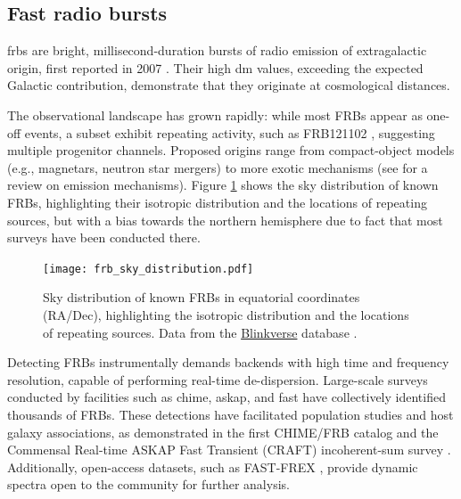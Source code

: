 \subsection{Fast radio bursts}
\label{sec:frbs}

\glspl{frb} are bright, millisecond-duration bursts of radio emission of extragalactic origin, first reported in 2007 \citep{Lorimer_2007}. Their high \gls{dm} values, exceeding the expected Galactic contribution, demonstrate that they originate at cosmological distances. 


The observational landscape has grown rapidly: while most FRBs appear as one-off events, a subset exhibit repeating activity, such as FRB121102 \citep{Spitler_2016}, suggesting multiple progenitor channels. Proposed origins range from compact-object models (e.g., magnetars, neutron star mergers) to more exotic mechanisms (see \citealt{Zhang2023physics} for a review on emission mechanisms). Figure \ref{fig:frb_sky_distribution} shows the sky distribution of known FRBs, highlighting their isotropic distribution \citep{Josephy2021} and the locations of repeating sources, but with a bias towards the northern hemisphere due to fact that most surveys have been conducted there.

\begin{figure}[h!]
	\centering
	\texttt{[image: frb\_sky\_distribution.pdf]}
	\caption[Sky distribution of known FRBs]{Sky distribution of known FRBs in equatorial coordinates (RA/Dec), highlighting the isotropic distribution and the locations of repeating sources. Data from the \href{https://blinkverse.zero2x.org/overview}{Blinkverse} database \citep{Blinkverse2023}.}
	\label{fig:frb_sky_distribution}
\end{figure}

Detecting FRBs instrumentally demands backends with high time and frequency resolution, capable of performing real-time de-dispersion. Large-scale surveys conducted by facilities such as \gls{chime}, \gls{askap}, and \gls{fast} have collectively identified thousands of FRBs. These detections have facilitated population studies and host galaxy associations, as demonstrated in the first CHIME/FRB catalog \citep{CHIMEcatalog2021} and the Commensal Real-time ASKAP Fast Transient (CRAFT) incoherent-sum survey \citep{Shannon_2025}. Additionally, open-access datasets, such as FAST-FREX \citep{FAST-FREX}, provide dynamic spectra open to the community for further analysis.

